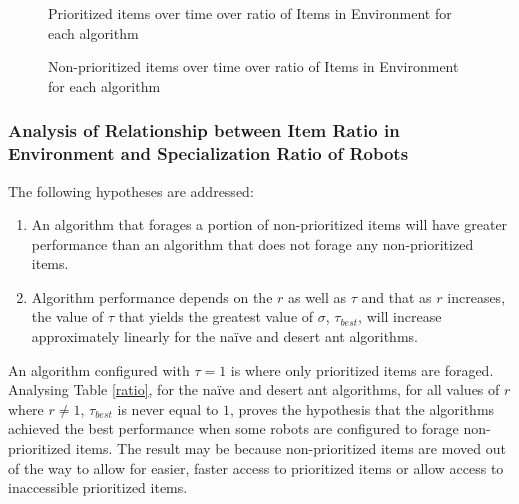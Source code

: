 \begin{figure}[!htb]
\centering
\resizebox{\textwidth}{!}{}
\caption{Prioritized items over time over ratio of Items in Environment for each algorithm }
\label{ratiogoldplot}
\end{figure}



\begin{figure}[!htb]
\centering
\resizebox{\textwidth}{!}{}
\caption{Non-prioritized items over time over ratio of Items in Environment for each algorithm}
\label{ratiowasteplot}
\end{figure}

\subsubsection{Analysis of Relationship between Item Ratio in Environment and Specialization Ratio of Robots}
\label{relationship}

The following hypotheses are addressed:
\begin{enumerate}
\item An algorithm that forages a portion of non-prioritized items will have greater performance than an algorithm that does not forage any non-prioritized items.
\item Algorithm performance depends on the $r$ as well as $\tau$ and that as $r$ increases, the value of $\tau$ that yields the greatest value of $\sigma$, $\tau_{best}$, will increase approximately linearly for the na\"ive and desert ant algorithms.
\end{enumerate}

An algorithm configured with $\tau=1$ is where only prioritized items are foraged. Analysing Table \ref{ratio}, for the na\"ive and desert ant algorithms, for all values of $r$ where $r \neq 1$, $\tau_{best}$ is never equal to $1$, proves the hypothesis that the algorithms achieved the best performance when some robots are configured to forage non-prioritized items. The result may be because non-prioritized items are moved out of the way to allow for easier, faster access to prioritized items or allow access to inaccessible prioritized items.


